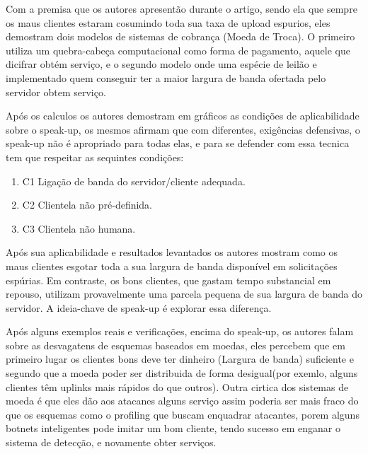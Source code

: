 \documentclass[a4paper,12pt]{article}
\begin{document}
\vspace{0.3cm}


Com a premisa que os autores apresentão durante o artigo, sendo ela que sempre os maus clientes estaram cosumindo toda sua taxa de upload espurios, eles demostram dois modelos de sistemas de cobrança (Moeda de Troca). O primeiro utiliza um quebra-cabeça computacional como forma de pagamento, aquele que dicifrar obtém serviço, e o segundo modelo onde uma espécie de leilão e implementado quem conseguir ter a maior largura de banda ofertada pelo servidor obtem serviço. 

\vspace{0.3cm}


Após os calculos os autores demostram em gráficos as condições de aplicabilidade sobre o speak-up, os mesmos afirmam que com diferentes, exigências defensivas, o speak-up não é apropriado para todas elas, e para se defender com essa tecnica tem que respeitar as sequintes condições: 

\begin{enumerate}
	\item{C1} Ligação de banda do servidor/cliente adequada.

	\item{C2} Clientela não pré-definida.

	\item{C3} Clientela não humana.

\end{enumerate}
 
 \vspace{0.3cm}
 
 Após sua aplicabilidade e resultados levantados os autores mostram como os maus clientes esgotar toda a sua largura de banda disponível em solicitações espúrias. Em contraste, os bons clientes, que gastam tempo substancial em repouso, utilizam provavelmente uma parcela pequena de sua largura de banda do servidor. A ideia-chave de speak-up é explorar essa diferença.
 \vspace{0.3cm}
 
 \vspace{0.3cm}
 
 Após alguns exemplos reais e verificações, encima do speak-up, os autores falam sobre as desvagatens de esquemas baseados em moedas, eles percebem que em primeiro lugar os clientes bons deve ter dinheiro (Largura de banda) suficiente e segundo que a moeda poder ser distribuida de forma desigual(por exemlo, alguns clientes têm uplinks mais rápidos do que outros). Outra cirtica dos sistemas de moeda é que eles dão aos atacanes alguns serviço assim poderia ser mais fraco do que os esquemas como o profiling que buscam enquadrar atacantes, porem alguns botnets inteligentes pode imitar um bom cliente, tendo sucesso em enganar o sistema de detecção, e novamente obter serviços.
 
\end{document}
